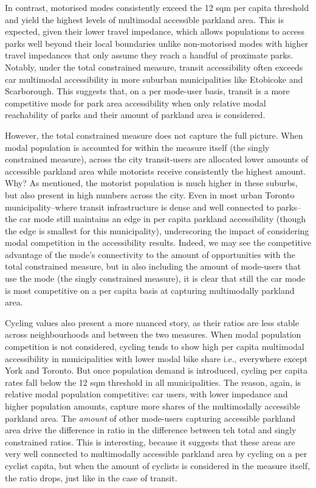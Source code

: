 \documentclass[
11pt, %
oneside, %
english, %
singlespacing, %
]{macthesis} %
\begin{document}
In contrast, motorised modes consistently exceed the 12 sqm per capita threshold and yield the highest levels of multimodal accessible parkland area. This is expected, given their lower travel impedance, which allows populations to access parks well beyond their local boundaries unlike non-motorised modes with higher travel impedances that only assume they reach a handful of proximate parks. Notably, under the total constrained measure, transit accessibility often exceeds car multimodal accessibility in more suburban municipalities like Etobicoke and Scarborough. This suggests that, on a per mode-user basis, transit is a more competitive mode for park area accessibility when only relative modal reachability of parks and their amount of parkland area is considered.

However, the total constrained measure does not capture the full picture. When modal population is accounted for within the measure itself (the singly constrained measure), across the city transit-users are allocated lower amounts of accessible parkland area while motorists receive consistently the highest amount. Why? As mentioned, the motorist population is much higher in these suburbs, but also present in high numbers across the city. Even in most urban Toronto municipality--where transit infrastructure is dense and well connected to parks--the car mode still maintains an edge in per capita parkland accessibility (though the edge is smallest for this municipality), underscoring the impact of considering modal competition in the accessibility results. Indeed, we may see the competitive advantage of the mode's connectivity to the amount of opportunities with the total constrained measure, but in also including the amount of mode-users that use the mode (the singly constrained measure), it is clear that still the car mode is most competitive on a per capita basis at capturing multimodally parkland area.

Cycling values also present a more nuanced story, as their ratios are less stable across neighbourhoods and between the two measures. When modal population competition is not considered, cycling tends to show high per capita multimodal accessibility in municipalities with lower modal bike share i.e., everywhere except York and Toronto. But once population demand is introduced, cycling per capita rates fall below the 12 sqm threshold in all municipalities. The reason, again, is relative modal population competitive: car users, with lower impedance and higher population amounts, capture more shares of the multimodally accessible parkland area. The \emph{amount} of other mode-users capturing accessible parkland area drive the difference in ratio in the difference between teh total and singly constrained ratios. This is interesting, because it suggests that these areas are very well connected to multimodally accessible parkland area by cycling on a per cyclist capita, but when the amount of cyclists is considered in the measure itself, the ratio drops, just like in the case of transit.
\end{document}
